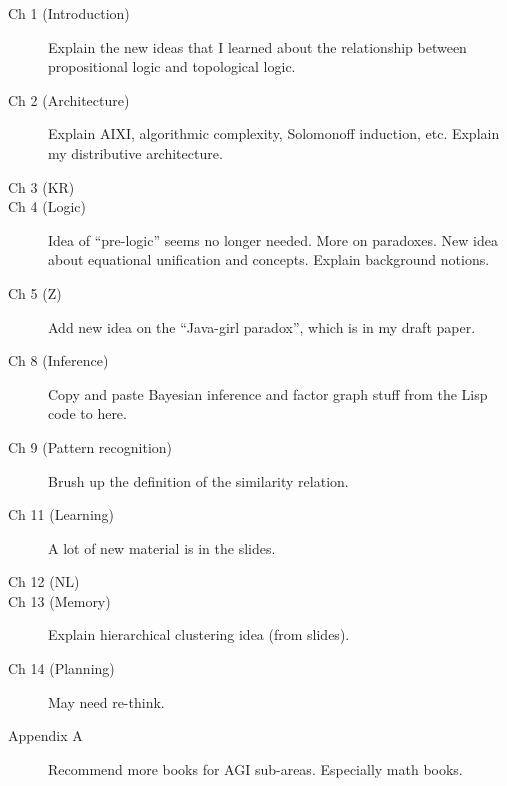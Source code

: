 \documentclass[12pt, a4paper]{report}
\begin{document}
\begin{description}

\item[Ch 1 (Introduction)]  Explain the new ideas that I learned about the relationship between propositional logic and topological logic.

\item[Ch 2 (Architecture)]  Explain AIXI, algorithmic complexity, Solomonoff induction, etc.  Explain my distributive architecture.

\item[Ch 3 (KR)]

\item[Ch 4 (Logic)]  Idea of ``pre-logic'' seems no longer needed.  More on paradoxes.  New idea about equational unification and concepts.  Explain background notions.

\item[Ch 5 (Z)]  Add new idea on the ``Java-girl paradox'', which is in my draft paper.

\item[Ch 8 (Inference)]  Copy and paste Bayesian inference and factor graph stuff from the Lisp code to here.

\item[Ch 9 (Pattern recognition)]  Brush up the definition of the similarity relation.

\item[Ch 11 (Learning)]  A lot of new material is in the slides.

\item[Ch 12 (NL)]

\item[Ch 13 (Memory)]  Explain hierarchical clustering idea (from slides).

\item[Ch 14 (Planning)]  May need re-think.

\item[Appendix A]  Recommend more books for AGI sub-areas.  Especially math books.

\end{description}

\color{black}

\tableofcontents





















\end{document}
